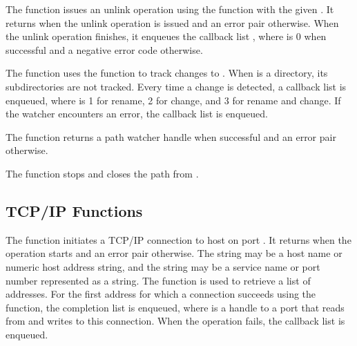 \begin{function}
\end{function}

The  function issues an unlink operation using the
 function with the given . It returns
 when the unlink operation is issued and an error pair
otherwise. When the unlink operation finishes, it enqueues the
callback list , where 
is 0 when successful and a negative error code otherwise.

\begin{function}
\end{function}

The  function uses the
 function to track changes to
. When  is a directory, its subdirectories are not
tracked. Every time a change is detected, a callback list
 is enqueued, where
 is 1 for rename, 2 for change, and 3 for rename and
change.  If the watcher encounters an error, the callback list
 is enqueued.

The  function returns a path watcher handle
when successful and an error pair otherwise.

\begin{function}
\end{function}

The  function stops and closes the
path  from .

\subsection {TCP/IP Functions}

\begin{function}
\end{function}

The  function initiates a TCP/IP connection to
host  on port . It returns  when the
operation starts and an error pair otherwise. The  string
may be a host name or numeric host address string, and the
 string may be a service name or port number represented
as a string. The  function is used to retrieve a
list of addresses. For the first address for which a connection
succeeds using the  function, the completion
list  is enqueued, where 
is a handle to a port that reads from and writes to this
connection. When the operation fails, the callback list
 is enqueued.


